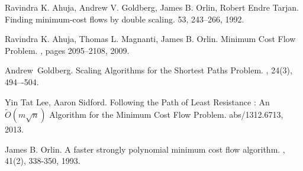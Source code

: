 \documentclass[11pt]{article}
\begin{document}


\begin{thebibliography}{42}

Ravindra K. Ahuja, Andrew V. Goldberg, James B. Orlin, Robert Endre Tarjan.
\newblock Finding minimum-cost flows by double scaling. 
 53, 243--266, 1992.

Ravindra K. Ahuja, Thomas L. Magnanti, James B. Orlin.
\newblock Minimum Cost Flow Problem. 
, pages 2095--2108, 2009.

Andrew~Goldberg.
\newblock Scaling Algorithms for the Shortest Paths Problem.
, 24(3), 494–-504.

Yin Tat Lee, Aaron Sidford.
\newblock Following the Path of Least Resistance : An $\tilde{O}(m\sqrt{n})$ Algorithm for the Minimum Cost Flow Problem.
 abs/1312.6713, 2013.

James B. Orlin. 
\newblock A faster strongly polynomial minimum cost flow algorithm. 
, 41(2), 338-350, 1993.

\end{thebibliography}
\end{document}
